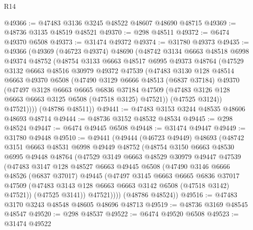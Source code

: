 \begin{lexlean}{R14}
\begin{coremodule}
@49366 := @47483 @3136 @3245 @48522 @48607 @48690 @48715
@49369 := @48736 @3135 @48519 @48521
@49370 := @298 @48511
@49372 := @6474 @49370 @6508
@49373 := @31474 @49372
@49374 := @31780 @49373
@49435 := @49366
    (@49369
      (@46723 @49374)
      @48690
      (@48742
        @3134
        @6663
        @48518
        @6998
        @49374
        @48752
        (@48754
          @3133
          @6663
          @48517
          @6995
          @49373
          @48764
          (@47529
            @3132
            @6663
            @48516
            @30979
            @49372
            @47539
            (@47483
              @3130
              @128
              @48514
              @6663
              @49370
              @6508
              (@47490
                @3129
                @6666
                @48513
                (@6837 @37184)
                @49370
                (@47497
                  @3128
                  @6663
                  @6665
                  @6836
                  @37184
                  @47509
                  (@47483 @3126 @128 @6663 @6663 @3125 @6508 (@47518 @3125) @47521))
                (@47525 @3124))
              @47521))))
      (@48786 @48511))
@49441 := @47483 @3153 @3244 @48535 @48606 @48693 @48714
@49444 := @48736 @3152 @48532 @48534
@49445 := @298 @48524
@49447 := @6474 @49445 @6508
@49448 := @31474 @49447
@49449 := @31780 @49448
@49510 := @49441
    (@49444
      (@46723 @49449)
      @48693
      (@48742
        @3151
        @6663
        @48531
        @6998
        @49449
        @48752
        (@48754
          @3150
          @6663
          @48530
          @6995
          @49448
          @48764
          (@47529
            @3149
            @6663
            @48529
            @30979
            @49447
            @47539
            (@47483
              @3147
              @128
              @48527
              @6663
              @49445
              @6508
              (@47490
                @3146
                @6666
                @48526
                (@6837 @37017)
                @49445
                (@47497
                  @3145
                  @6663
                  @6665
                  @6836
                  @37017
                  @47509
                  (@47483 @3143 @128 @6663 @6663 @3142 @6508 (@47518 @3142) @47521))
                (@47525 @3141))
              @47521))))
      (@48786 @48524))
@49516 := @47483 @3170 @3243 @48548 @48605 @48696 @48713
@49519 := @48736 @3169 @48545 @48547
@49520 := @298 @48537
@49522 := @6474 @49520 @6508
@49523 := @31474 @49522

\end{coremodule}
\end{lexlean}
